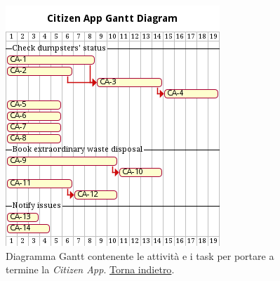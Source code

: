 \begin{figure}[H]
    \centering
    \includegraphics[width=\textwidth]{uml/gantt-citizen-app.pm}
    \caption{Diagramma Gantt contenente le attività e i task per portare a termine la \textit{Citizen App}. \hyperlink{back:uml/gantt-citizen-app}{Torna indietro}.}
    \label{fig:uml/gantt-citizen-app}
\end{figure}

